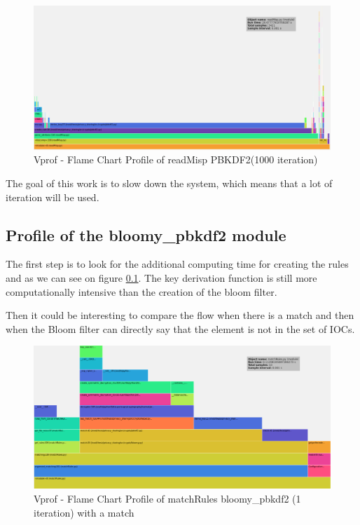 \documentclass{eplmastersthesis}
\begin{document}
\begin{figure}[h!]
\begin{center}
	\includegraphics[scale=0.3]{res/profile-1000iter}
	\caption{Vprof - Flame Chart Profile of readMisp PBKDF2(1000 iteration)}
	\label{profile-readMisp1000}
\end{center}
\end{figure}

The goal of this work is to slow down the system, which means that a lot of iteration will be used. \\

\subsection{Profile of the bloomy\_pbkdf2 module}
The first step is to look for the additional computing time for creating the rules and as we can see on figure \ref{}. The key derivation function is still more computationally intensive than the creation of the bloom filter.\\


Then it could be interesting to compare the flow when there is a match and then when the Bloom filter can directly say that the element is not in the set of IOCs.\\

\begin{figure}[h!]
\begin{center}
	\includegraphics[scale=0.3]{res/match-exist}
	\caption{Vprof - Flame Chart Profile of matchRules bloomy\_pbkdf2 (1 iteration) with a match}
	\label{profile-bloomy-match}
\end{center}
\end{figure}
\end{document}
